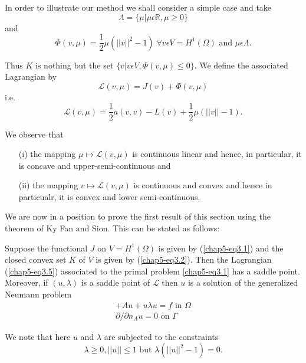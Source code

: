 In order to illustrate our method we shall consider a simple case and take
\begin{equation*}
\Lambda = \{\mu | \mu \epsilon \mathbb{R}, \mu \geq 0 \}\tag{3.3}\label{chap5-eq3.3}
\end{equation*}
and
\begin{equation*}
\Phi(v, \mu) = \frac{1}{2} \mu (||v||^{2} - 1) \; \forall v \epsilon V = H^{1} (\Omega) \text{ and } \mu \epsilon \Lambda.\tag{3.4}\label{chap5-eq3.4}
\end{equation*}

Thus $K$ is nothing but the set $\{v | v \epsilon V, \Phi(v, \mu) \leq 0 \}$. We define the associated Lagrangian by
$$
\mathscr{L} (v, \mu) = J(v) + \Phi(v, \mu)
$$
i.e.\pageoriginale
\begin{equation*}
\mathscr{L} (v, \mu) = \frac{1}{2} a(v, v) - L(v) + \frac{1}{2} \mu (||v|| - 1).\tag{3.5}\label{chap5-eq3.5}
\end{equation*}

 We observe that
\begin{enumerate}
\item[(i)] the mapping $\mu \mapsto \mathscr{L}(v, \mu)$ is continuous linear and hence, in particular, it is concave and upper-semi-continuous and

\item[(ii)] the mapping $v \mapsto \mathscr{L}(v, \mu)$ is continuous and convex and hence in particualr, it is convex and lower semi-continuous.
\end{enumerate}

We are now in a position to prove the first result of this section using the theorem of Ky Fan and Sion. This can be stated as follows:

\begin{theorem}\label{chap5-thm3.1}
Suppose the functional $J$ on $V = H^{1} (\Omega)$ is given by (\ref{chap5-eq3.1}) and the closed convex set $K$ of $V$ is given by (\ref{chap5-eq3.2}). Then the Lagrangian (\ref{chap5-eq3.5}) associated to the primal problem \ref{chap5-eq3.1} has a saddle point. Moreover, if $(u, \lambda)$ is a saddle point of $\mathscr{L}$ then $u$ is a solution of the generalized Neumann problem
\begin{align*}
+ Au + u \lambda u = f \text{ in } \Omega\\
\partial / \partial n_{A} u = 0 \text{ on } \Gamma\tag{3.6}\label{chap5-eq3.6}
\end{align*}

We note that here $u$ and $\lambda$ are subjected to the constraints
\begin{equation*}
\lambda \geq 0, ||u|| \leq 1 \text{ but } \lambda (||u||^{2} - 1) = 0.\tag{3.7}\label{chap5-eq3.7}
\end{equation*}
\end{theorem}

